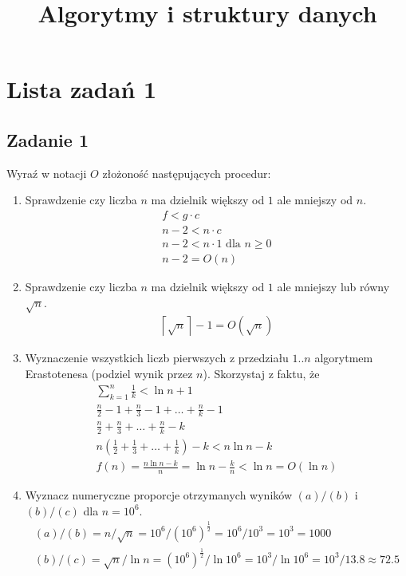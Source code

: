 \documentclass{article}
\begin{document}
\title{Algorytmy i struktury danych}
\author{}
\date{}
\maketitle

\section*{Lista zadań 1}
\subsection*{Zadanie 1}
Wyraź w notacji $O$ złożoność następujących procedur:
\begin{enumerate}[label=(\alph*)]
    \item Sprawdzenie czy liczba $n$ ma dzielnik większy od $1$ ale mniejszy od $n$.
          \begin{gather*}
              f < g \cdot c \\
              n-2 < n \cdot c \\
              n-2 < n \cdot 1 \text{ dla }n \geq 0 \\
              n-2 = O(n)
          \end{gather*}
    \item Sprawdzenie czy liczba $n$ ma dzielnik większy od $1$ ale mniejszy lub równy $\sqrt{n}$.
          \begin{gather*}
              \left \lceil {\sqrt{n}} \right \rceil - 1 = O(\sqrt{n})
          \end{gather*}
    \item Wyznaczenie wszystkich liczb pierwszych z przedziału $1..n$ algorytmem Erastotenesa
          (podziel wynik przez $n$). Skorzystaj z faktu, że
          \begin{gather*}
              \sum_{k=1}^{n} \frac{1}{k} < \ln n + 1 \\
              \frac{n}{2}-1 + \frac{n}{3}-1 + \dots + \frac{n}{k}-1 \\
              \frac{n}{2} + \frac{n}{3} + \dots + \frac{n}{k} - k \\
              n(\frac{1}{2} + \frac{1}{3} + \dots + \frac{1}{k}) - k < n \ln n - k \\
              f(n)=\frac{n \ln n - k}{n} = \ln n - \frac{k}{n} < \ln n = O(\ln n)
          \end{gather*}
    \item Wyznacz numeryczne proporcje otrzymanych wyników $(a)/(b)$ i $(b)/(c)$ dla $n = 10^6$.
          \begin{gather*}
              (a)/(b) = n/\sqrt{n} = 10^6/(10^6)^\frac{1}{2} = 10^6/10^3 = 10^3 = 1000 \\
              (b)/(c) = \sqrt{n}/\ln n = (10^6)^\frac{1}{2}/\ln 10^6 = 10^3/\ln 10^6 = 10^3/13.8 \approx 72.5
          \end{gather*}

\end{enumerate}
\end{document}
